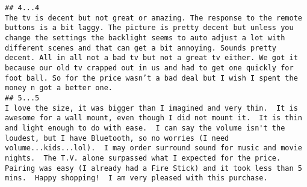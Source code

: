 \documentclass[
  11pt,
]{article}
\begin{document}
\begin{verbatim}
## 4...4                                                                                                                                                                                                                                                                                                                                                                                                                                                                                                                                                                                                                                                                                                                                                                                                                                                                                                                                                                                                                                                          The tv is decent but not great or amazing. The response to the remote buttons is a bit laggy. The picture is pretty decent but unless you change the settings the backlight seems to auto adjust a lot with different scenes and that can get a bit annoying. Sounds pretty decent. All in all not a bad tv but not a great tv either. We got it because our old tv crapped out in us and had to get one quickly for foot ball. So for the price wasn’t a bad deal but I wish I spent the money n got a better one.
## 5...5                                                                                                                                                                                                                                                                                                                                                                                                                                                                                                                                                                                                                                                                                                                                                                                                                                                                                                                                                                                                                                I love the size, it was bigger than I imagined and very thin.  It is awesome for a wall mount, even though I did not mount it.  It is thin and light enough to do with ease.  I can say the volume isn't the loudest, but I have Bluetooth, so no worries (I need volume...kids...lol).  I may order surround sound for music and movie nights.  The T.V. alone surpassed what I expected for the price.  Pairing was easy (I already had a Fire Stick) and it took less than 5 mins.  Happy shopping!  I am very pleased with this purchase.

\end{verbatim}
\end{document}

